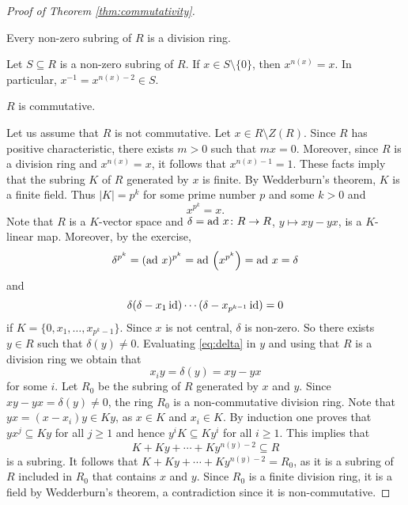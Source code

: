 \begin{proof}[Proof of Theorem \ref{thm:commutativity}]
    \begin{claim}
        Every non-zero subring of $R$ is a division ring. 
    \end{claim}
    
    Let $S\subseteq R$ is a non-zero subring of $R$. If $x\in S\setminus\{0\}$, 
    then 
    $x^{n(x)}=x$. In particular, $x^{-1}=x^{n(x)-2}\in S$.
    
    \begin{claim}
        $R$ is commutative.
    \end{claim}
    
    Let us assume that $R$ is not commutative. Let $x\in R\setminus Z(R)$. 
    Since $R$ has positive characteristic, there exists $m>0$ such that 
    $mx=0$. Moreover, since $R$ is a division ring and 
    $x^{n(x)}=x$, it follows that $x^{n(x)-1}=1$. These facts imply that
    the subring $K$ of $R$ generated by
    $x$ is finite. By Wedderburn's theorem, $K$ is 
    a finite field. 
    Thus 
    $|K|=p^k$ for some prime number $p$ and some $k>0$ and 
    \[
    x^{p^k}=x.
    \]
    Note that $R$ is a $K$-vector space
    and $\delta=\operatorname{ad}\,x\colon R\to R$, $y\mapsto xy-yx$, is a $K$-linear map. Moreover, 
    by the exercise, 
    \[
    \delta^{p^k}=(\operatorname{ad}\,x)^{p^k}=\operatorname{ad}\,\left(x^{p^k}\right)=\operatorname{ad}\,x=\delta
    \]
    and 
    \begin{equation}
        \label{eq:delta}
        \delta(\delta-x_1\operatorname{id})\cdots (\delta-x_{p^{k-1}}\operatorname{id})=0
    \end{equation}
    if $K=\{0,x_1,\dots,x_{p^k-1}\}$. Since $x$ is not central, 
    $\delta$ is non-zero. So there exists $y\in R$ such that $\delta(y)\ne 0$. 
    Evaluating \eqref{eq:delta} in $y$ and using that $R$ is a division ring 
    we obtain that 
    \[
    x_iy=\delta(y)=xy-yx
    \]
    for some $i$. Let $R_0$ be the subring of $R$ generated by $x$ and $y$. 
    Since $xy-yx=\delta(y)\ne 0$, the ring $R_0$ is a 
    non-commutative division ring. Note that 
    $yx=(x-x_i)y\in Ky$, as $x\in K$ and $x_i\in K$. By induction one proves
    that $yx^j\subseteq Ky$ for all $j\geq 1$ and hence
    $y^iK\subseteq Ky^i$ for
    all $i\geq1$. This implies that
    \[
    K+Ky+\cdots+Ky^{n(y)-2}\subseteq R
    \]
    is a subring. It follows that $K+Ky+\cdots+Ky^{n(y)-2}=R_0$, 
    as it is a subring of $R$ included in $R_0$ 
    that contains $x$ and $y$. Since 
    $R_0$ is a finite division ring, it is a field 
    by Wedderburn's theorem, a contradiction since
    it is non-commutative.
\end{proof}

